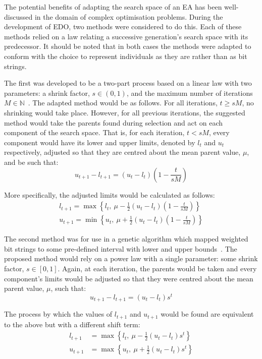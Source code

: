 The potential benefits of adapting the search space of an EA has been
well-discussed in the domain of complex optimisation problems. During the
development of EDO, two methods were considered to do this. Each of these
methods relied on a law relating a successive generation's search space with its
predecessor. It should be noted that in both cases the methods were adapted to
conform with the choice to represent individuals as they are rather than as bit
strings.

The first was developed to be a two-part process based on a linear law with two
parameters: a shrink factor, \(s \in (0, 1)\), and the maximum number of
iterations \(M \in \mathbb{N}\)~\cite{Amirjanov2017}. The adapted method would
be as follows. For all iterations, \(t \geq sM\), no shrinking would take place.
However, for all previous iterations, the suggested method would take the
parents found during selection and act on each component of the search space.
That is, for each iteration, \(t < sM\), every component would have its lower
and upper limits, denoted by \(l_t\) and \(u_t\) respectively, adjusted so that
they are centred about the mean parent value, \(\mu\), and be such that:
\[
    u_{t+1} - l_{t+1} = (u_t - l_t) \left(1 - \frac{t}{sM}\right)
\]

More specifically, the adjusted limits would be calculated as follows:
\begin{align*}
    l_{t+1} = \max \left\{%
        l_t, \ \mu - \frac{1}{2} (u_t - l_t) \left(1 - \frac{t}{sM}\right)
    \right\}\\
    u_{t+1} = \min \left\{%
        u_t, \ \mu + \frac{1}{2} (u_t - l_t) \left(1 - \frac{t}{sM}\right)
    \right\}
\end{align*}

The second method was for use in a genetic algorithm which mapped weighted bit
strings to some pre-defined interval with lower and upper
bounds~\cite{Amirjanov2016}. The proposed method would rely on a power law with
a single parameter: some shrink factor, \(s \in [0, 1]\). Again, at each
iteration, the parents would be taken and every component's limits would be
adjusted so that they were centred about the mean parent value, \(\mu\), such
that:
\[
    u_{t+1} - l_{t+1} = (u_t - l_t) s^t
\]

The process by which the values of \(l_{t+1}\) and \(u_{t+1}\) would be found
are equivalent to the above but with a different shift term:
\begin{align}
    \label{eq:shrinking_lower}
    l_{t+1}&= \max \left\{l_t, \ \mu - \frac{1}{2} (u_t - l_t) s^t\right\}\\
    \label{eq:shrinking_upper}
    u_{t+1}&= \max \left\{u_t, \ \mu + \frac{1}{2} (u_t - l_t) s^t\right\}
\end{align}

